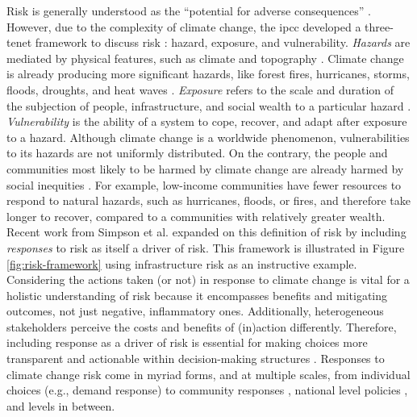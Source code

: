 Risk is generally understood as the ``potential for adverse consequences''
\cite{reisinger_concept_2020}. However, due to the complexity of climate change,
the \ac{ipcc} developed a three-tenet framework to discuss risk
\cite{reisinger_concept_2020}: hazard, exposure, and vulnerability.
\textit{Hazards} are mediated by physical features, such as climate and
topography \cite{dorkenoo_critical_2022, simpson_framework_2021}.  Climate
change is already producing more significant hazards, like forest fires,
hurricanes, storms, floods, droughts, and heat waves
\cite{reidmiller_fourth_2018,
intergovernmental_panel_on_climate_change_climate_2021, dahl_killer_2019}.
\textit{Exposure} refers to the scale and duration of the subjection of people,
infrastructure, and social wealth to a particular hazard
\cite{simpson_framework_2021,reisinger_concept_2020,li_understanding_2021}.
\textit{Vulnerability} is the ability of a system to cope, recover, and adapt
after exposure to a hazard. Although climate change is a worldwide phenomenon,
vulnerabilities to its hazards are not uniformly distributed. On the contrary,
the people and communities most likely to be harmed by climate change are
already harmed by social inequities \cite{islam_climate_2017}. For example, 
low-income communities have fewer resources to respond to natural hazards,
such as hurricanes, floods, or fires, and therefore take longer to recover, compared
to a communities with relatively greater wealth. Recent work from
Simpson et al. \cite{simpson_framework_2021} expanded on this definition of risk
by including \textit{responses} to risk as itself a driver of risk. This
framework is illustrated in Figure \ref{fig:risk-framework} using infrastructure
risk as an instructive example. Considering the actions taken (or not) in
response to climate change is vital for a holistic understanding of risk because
it encompasses benefits and mitigating outcomes, not just negative, inflammatory
ones. Additionally, heterogeneous stakeholders perceive the costs and benefits
of (in)action differently. Therefore, including response as a driver of risk is
essential for making choices more transparent and actionable within
decision-making structures \cite{simpson_framework_2021}. Responses to climate
change risk come in myriad forms,  and at multiple scales, from individual
choices (e.g., demand response) \cite{seck_embedding_2020,rinaldi_what_2022,
dehghanpour_agent-based_2018} to community responses
\cite{paterson_community-based_2019, elmallah_frontlining_2022}, national
level policies \cite{roelfsema_taking_2020, fawzy_strategies_2020}, and levels in between. 
